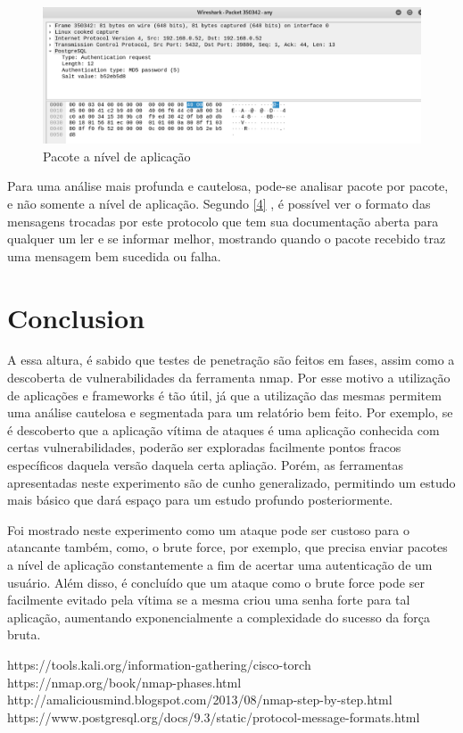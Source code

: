 \documentclass[journal]{IEEEtran}
\begin{document}
\begin{figure}[h!]
	\includegraphics[width=\linewidth]{../PGSQL_application_protocol.png}
	\caption{Pacote a nível de aplicação}
	\label{fig:application_packet}
\end{figure}

Para uma análise mais profunda e cautelosa, pode-se analisar pacote por pacote, e não somente a nível de aplicação. Segundo \hyperlink{Key1}{[4]} , é possível ver o formato das mensagens trocadas por este protocolo que tem sua documentação aberta para qualquer um ler e se informar melhor, mostrando quando o pacote recebido traz uma mensagem bem sucedida ou falha.

\section{Conclusion}
A essa altura, é sabido que testes de penetração são feitos em fases, assim como a descoberta de vulnerabilidades da ferramenta nmap. Por esse motivo a utilização de aplicações e frameworks é tão útil, já que a utilização das mesmas permitem uma análise cautelosa e segmentada para um relatório bem feito. Por exemplo, se é descoberto que a aplicação vítima de ataques é uma aplicação conhecida com certas vul\-ne\-ra\-bi\-li\-da\-des, poderão ser exploradas facilmente pontos fracos específicos daquela versão daquela certa apliação. Porém, as ferramentas apresentadas neste experimento são de cunho generalizado, permitindo um estudo mais básico que dará espaço para um estudo profundo posteriormente.\par 
Foi mostrado neste experimento como um ataque pode ser custoso para o atancante também, como, o brute force, por exemplo, que precisa enviar pacotes a nível de aplicação constantemente a fim de acertar uma autenticação de um usuário. Além disso, é concluído que um ataque como o brute force pode ser facilmente evitado pela vítima se a mesma criou uma senha forte para tal aplicação, aumentando exponencialmente a complexidade do sucesso da força bruta.



\begin{thebibliography}{1}

https://tools.kali.org/information-gathering/cisco-torch
https://nmap.org/book/nmap-phases.html
http://amaliciousmind.blogspot.com/2013/08/nmap-step-by-step.html
\hypertarget{Key1}{https://www.postgresql.org/docs/9.3/static/protocol-message-formats.html}


\end{thebibliography}
\end{document}
